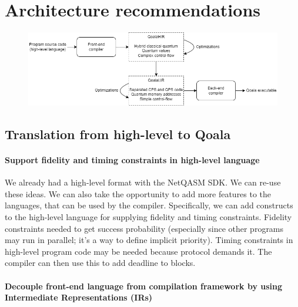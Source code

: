 \section{Architecture recommendations}

\begin{figure}
    \centering
    \includegraphics[width=\columnwidth]{figures/compiler/overall-design.png}
    \caption{}
    \label{compiler:fig:overall-design}
\end{figure}

\subsection{Translation from high-level to Qoala}

\paragraph{Support fidelity and timing constraints in high-level language}
We already had a high-level format with the NetQASM SDK.
We can re-use these ideas.
We can also take the opportunity to add more features to the languages, that can be used by the compiler.
Specifically, we can add constructs to the high-level language for supplying fidelity and timing constraints.
Fidelity constraints needed to get success probability (especially since other programs may run in parallel; it's a way to define implicit priority).
Timing constraints in high-level program code may be needed because protocol demands it.
The compiler can then use this to add deadline to blocks.

\paragraph{Decouple front-end language from compilation framework by using Intermediate Representations (IRs)}

